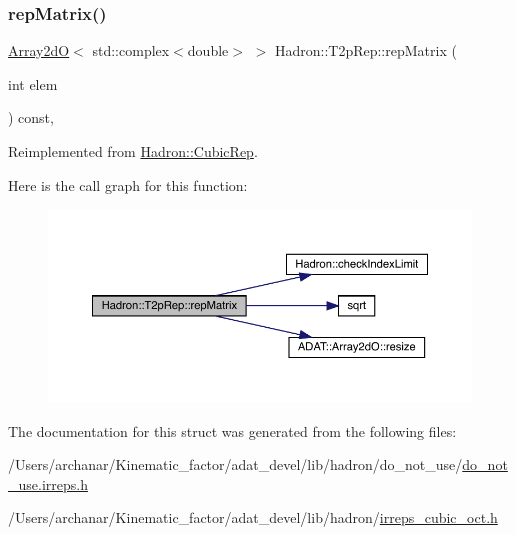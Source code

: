 \subsubsection{\texorpdfstring{repMatrix()}{repMatrix()}\hspace{0.1cm}{\footnotesize\ttfamily [2/2]}}
{\footnotesize\ttfamily \mbox{\hyperlink{classADAT_1_1Array2dO}{Array2dO}}$<$ std\+::complex$<$double$>$ $>$ Hadron\+::\+T2p\+Rep\+::rep\+Matrix (\begin{DoxyParamCaption}\item[{int}]{elem }\end{DoxyParamCaption}) const\hspace{0.3cm}{\ttfamily [inline]}, {\ttfamily [virtual]}}



Reimplemented from \mbox{\hyperlink{structHadron_1_1CubicRep_ac5d7e9e6f4ab1158b5fce3e4ad9e8005}{Hadron\+::\+Cubic\+Rep}}.

Here is the call graph for this function\+:
\nopagebreak
\begin{figure}[H]
\begin{center}
\leavevmode
\includegraphics[width=350pt]{d8/d6b/structHadron_1_1T2pRep_a9800949d2a6f8dcd4dd356947cae0488_cgraph}
\end{center}
\end{figure}


The documentation for this struct was generated from the following files\+:\begin{DoxyCompactItemize}
\item 
/\+Users/archanar/\+Kinematic\+\_\+factor/adat\+\_\+devel/lib/hadron/do\+\_\+not\+\_\+use/\mbox{\hyperlink{do__not__use_8irreps_8h}{do\+\_\+not\+\_\+use.\+irreps.\+h}}\item 
/\+Users/archanar/\+Kinematic\+\_\+factor/adat\+\_\+devel/lib/hadron/\mbox{\hyperlink{lib_2hadron_2irreps__cubic__oct_8h}{irreps\+\_\+cubic\+\_\+oct.\+h}}\end{DoxyCompactItemize}
